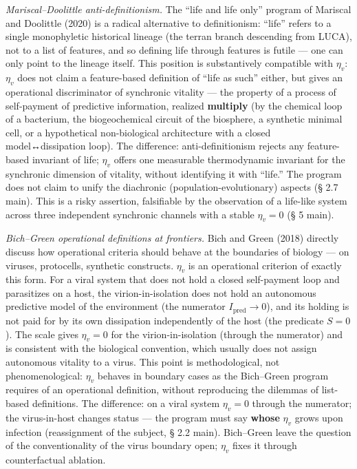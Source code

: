 \documentclass[pdflatex,sn-mathphys-ay]{sn-jnl}
\begin{document}
\emph{Mariscal--Doolittle anti-definitionism.} The ``life and life only'' program of Mariscal and Doolittle (2020) is a radical alternative to definitionism: ``life'' refers to a single monophyletic historical lineage (the terran branch descending from LUCA), not to a list of features, and so defining life through features is futile --- one can only point to the lineage itself. This position is substantively compatible with \(\eta_v\): \(\eta_v\) does not claim a feature-based definition of ``life as such'' either, but gives an operational discriminator of synchronic vitality --- the property of a process of self-payment of predictive information, realized \textbf{multiply} (by the chemical loop of a bacterium, the biogeochemical circuit of the biosphere, a synthetic minimal cell, or a hypothetical non-biological architecture with a closed model↔dissipation loop). The difference: anti-definitionism rejects any feature-based invariant of life; \(\eta_v\) offers one measurable thermodynamic invariant for the synchronic dimension of vitality, without identifying it with ``life.'' The program does not claim to unify the diachronic (population-evolutionary) aspects (§ 2.7 main). This is a risky assertion, falsifiable by the observation of a life-like system across three independent synchronic channels with a stable \(\eta_v = 0\) (§ 5 main).

\emph{Bich--Green operational definitions at frontiers.} Bich and Green (2018) directly discuss how operational criteria should behave at the boundaries of biology --- on viruses, protocells, synthetic constructs. \(\eta_v\) is an operational criterion of exactly this form. For a viral system that does not hold a closed self-payment loop and parasitizes on a host, the virion-in-isolation does not hold an autonomous predictive model of the environment (the numerator \(I_{\text{pred}} \to 0\)), and its holding is not paid for by its own dissipation independently of the host (the predicate \(S = 0\)). The scale gives \(\eta_v = 0\) for the virion-in-isolation (through the numerator) and is consistent with the biological convention, which usually does not assign autonomous vitality to a virus. This point is methodological, not phenomenological: \(\eta_v\) behaves in boundary cases as the Bich--Green program requires of an operational definition, without reproducing the dilemmas of list-based definitions. The difference: on a viral system \(\eta_v = 0\) through the numerator; the virus-in-host changes status --- the program must say \textbf{whose} \(\eta_v\) grows upon infection (reassignment of the subject, § 2.2 main). Bich--Green leave the question of the conventionality of the virus boundary open; \(\eta_v\) fixes it through counterfactual ablation.
\end{document}
